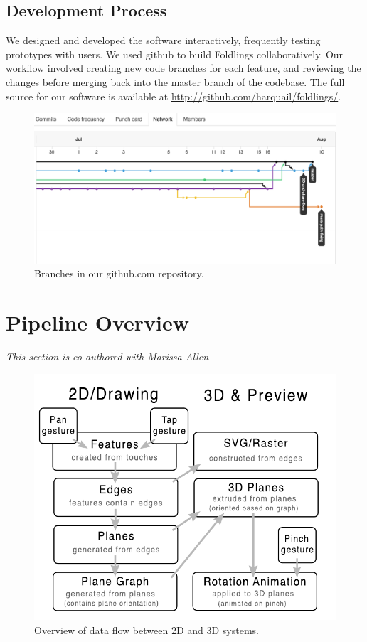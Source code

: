 \subsection{Development Process}\label{development-process}

We designed and developed the software interactively, frequently testing
prototypes with users. We used github to build Foldlings
collaboratively. Our workflow involved creating new code branches for
each feature, and reviewing the changes before merging back into the
master branch of the codebase. The full source for our software is
available at \url{http://github.com/harquail/foldlings/}.

\begin{figure}[htbp]
\centering
\includegraphics{figures/30_UI_Design_Philosophy/gitflow.png}
\caption{Branches in our github.com repository.}
\end{figure}

\section{Pipeline Overview}\label{pipeline-overview}

\emph{This section is co-authored with Marissa Allen}

\begin{figure}[htbp]
\centering
\includegraphics{figures/shared/02_Overview/pipeline.pdf}
\caption{Overview of data flow between 2D and 3D systems.}
\end{figure}

